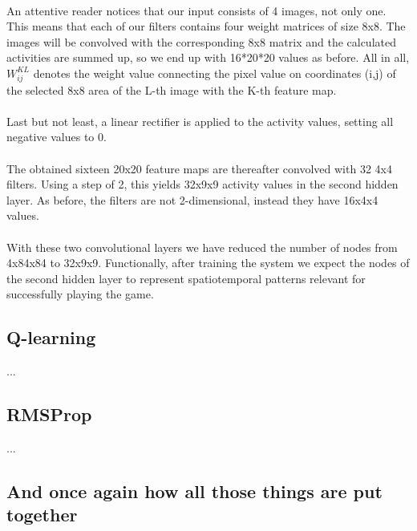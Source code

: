 \documentclass[a4paper,12pt]{article}
\begin{document}
\paragraph{}
An attentive reader notices that our input consists of 4 images, not only one. This means that each of our filters contains four weight matrices of size 8x8. The images will be convolved with the corresponding 8x8 matrix and the calculated activities are summed up, so we end up with 16*20*20 values as before. All in all, $W^{KL}_{ij}$ denotes the weight value connecting the pixel value on coordinates (i,j) of the selected 8x8 area of the L-th image with the K-th feature map.

\paragraph{}
Last but not least, a linear rectifier is applied to the activity values, setting all negative values to 0.
\paragraph{}
The obtained sixteen 20x20 feature maps are thereafter convolved with 32 4x4 filters. Using a step of 2, this yields 32x9x9 activity values in the second hidden layer. As before, the filters are not 2-dimensional, instead they have 16x4x4 values.
\paragraph{}
With these two convolutional layers we have reduced the number of nodes from 4x84x84 to 32x9x9. Functionally, after training the system we expect the nodes of the second hidden layer to represent spatiotemporal patterns relevant for successfully playing the game.

\subsection{Q-learning}
...

\subsection{RMSProp}
...


\subsection{And once again how all those things are put together}
\end{document}
